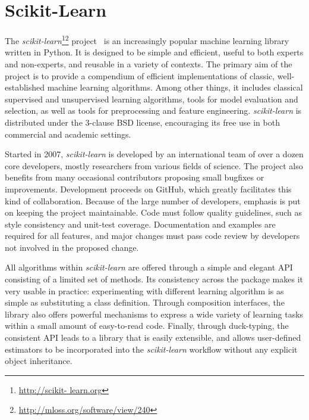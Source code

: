 \documentclass{article}
\newcommand{\sklearn}{\textit{scikit-learn}\xspace}
\begin{document}

\section*{Scikit-Learn}

The \sklearn\footnote{\url{http://scikit-
learn.org}}\footnote{\url{http://mloss.org/software/view/240}}
project~\citep{pedregosa2011} is an increasingly popular machine learning
library written in Python.  It is designed to be simple and efficient, useful
to both experts and non-experts, and reusable in a variety of contexts. The
primary aim of the project is to provide a compendium of efficient
implementations of classic, well-established  machine learning algorithms.
Among other things, it includes classical supervised and unsupervised learning
algorithms, tools for model evaluation and selection, as well as tools for
preprocessing and feature engineering. \sklearn is distributed under the
3-clause  BSD license, encouraging its free use in both commercial and academic
settings.

Started in 2007, \sklearn is developed by an international team of over a dozen
core developers, mostly researchers from various fields of science. The project
also benefits from many occasional contributors proposing small bugfixes or
improvements. Development proceeds on GitHub, which greatly facilitates this
kind of collaboration. Because of the large number of developers, emphasis is
put on keeping the project maintainable. Code must follow quality guidelines,
such as style consistency and unit-test coverage. Documentation and examples
are required for all features, and major changes must pass code review by developers not involved in the proposed change.

All algorithms within \sklearn are offered through a simple and elegant
API~\citep{buitinck2013api} consisting of a limited set of methods. Its
consistency across the package makes it very usable in practice: experimenting
with different learning algorithm is as simple as substituting a class
definition. Through composition interfaces, the library also offers powerful
mechanisms to express a wide variety of learning tasks within a small amount of
easy-to-read code. Finally, through duck-typing, the consistent API leads to a
library that is easily extensible, and allows user-defined estimators to be
incorporated into the \sklearn workflow without any explicit object
inheritance.
\end{document}
